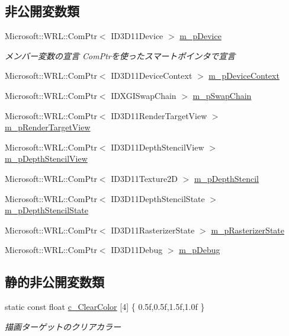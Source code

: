 \subsection*{非公開変数類}
\begin{DoxyCompactItemize}
\item 
Microsoft\+::\+W\+R\+L\+::\+Com\+Ptr$<$ I\+D3\+D11\+Device $>$ \hyperlink{class_d3_d11_1_1_direct3_d11_a76be9b3348b0abf14aaf6fc74f1c6ce8}{m\+\_\+p\+Device}
\begin{DoxyCompactList}\small\item\em メンバー変数の宣言  Com\+Ptrを使ったスマートポインタで宣言 \end{DoxyCompactList}\item 
Microsoft\+::\+W\+R\+L\+::\+Com\+Ptr$<$ I\+D3\+D11\+Device\+Context $>$ \hyperlink{class_d3_d11_1_1_direct3_d11_a96130435411c63bd3fbe61b3ea72cd1e}{m\+\_\+p\+Device\+Context}
\item 
Microsoft\+::\+W\+R\+L\+::\+Com\+Ptr$<$ I\+D\+X\+G\+I\+Swap\+Chain $>$ \hyperlink{class_d3_d11_1_1_direct3_d11_ac65621ae00fb1dc6918fad9de8777982}{m\+\_\+p\+Swap\+Chain}
\item 
Microsoft\+::\+W\+R\+L\+::\+Com\+Ptr$<$ I\+D3\+D11\+Render\+Target\+View $>$ \hyperlink{class_d3_d11_1_1_direct3_d11_a43a0f700bf837a8b14463a295aa78a0d}{m\+\_\+p\+Render\+Target\+View}
\item 
Microsoft\+::\+W\+R\+L\+::\+Com\+Ptr$<$ I\+D3\+D11\+Depth\+Stencil\+View $>$ \hyperlink{class_d3_d11_1_1_direct3_d11_aaf400f9f61eb658eafd0ca0c07bce101}{m\+\_\+p\+Depth\+Stencil\+View}
\item 
Microsoft\+::\+W\+R\+L\+::\+Com\+Ptr$<$ I\+D3\+D11\+Texture2D $>$ \hyperlink{class_d3_d11_1_1_direct3_d11_a57ba9b5b193de73e3832ed5afb20fc10}{m\+\_\+p\+Depth\+Stencil}
\item 
Microsoft\+::\+W\+R\+L\+::\+Com\+Ptr$<$ I\+D3\+D11\+Depth\+Stencil\+State $>$ \hyperlink{class_d3_d11_1_1_direct3_d11_a20316c9265ff7890678f87d99ba824c8}{m\+\_\+p\+Depth\+Stencil\+State}
\item 
Microsoft\+::\+W\+R\+L\+::\+Com\+Ptr$<$ I\+D3\+D11\+Rasterizer\+State $>$ \hyperlink{class_d3_d11_1_1_direct3_d11_a5332afbf9cb9c36f53b0c05219ed4ac0}{m\+\_\+p\+Rasterizer\+State}
\item 
Microsoft\+::\+W\+R\+L\+::\+Com\+Ptr$<$ I\+D3\+D11\+Debug $>$ \hyperlink{class_d3_d11_1_1_direct3_d11_a2322202b2972971329f77e27a6c0373b}{m\+\_\+p\+Debug}
\end{DoxyCompactItemize}
\subsection*{静的非公開変数類}
\begin{DoxyCompactItemize}
\item 
static const float \hyperlink{class_d3_d11_1_1_direct3_d11_a34ce02602072a5783535c33d2c8ed6bc}{c\+\_\+\+Clear\+Color} \mbox{[}4\mbox{]} \{ 0.\+5f,0.\+5f,1.\+5f,1.\+0f \}
\begin{DoxyCompactList}\small\item\em 描画ターゲットのクリアカラー \end{DoxyCompactList}\end{DoxyCompactItemize}
